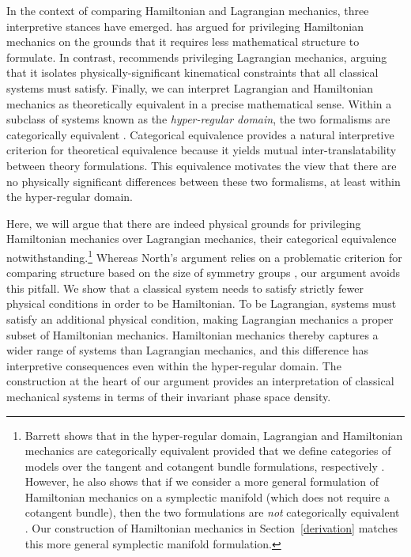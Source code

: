 \documentclass[12pt, english, twoside]{article} %
\begin{document}
In the context of comparing Hamiltonian and Lagrangian mechanics, three interpretive stances have emerged. \textcites[]{North} has argued for privileging Hamiltonian mechanics on the grounds that it requires less mathematical structure to formulate. In contrast, \textcites[]{Curiel} recommends privileging Lagrangian mechanics, arguing that it isolates physically-significant kinematical constraints that all classical systems must satisfy. Finally, we can interpret Lagrangian and Hamiltonian mechanics as theoretically equivalent in a precise mathematical sense. Within a subclass of systems known as the \textit{hyper-regular domain}, the two formalisms are categorically equivalent \parencites[]{Teh}{Barrett2}. Categorical equivalence provides a natural interpretive criterion for theoretical equivalence because it yields mutual inter-translatability between theory formulations. This equivalence motivates the view that there are no physically significant differences between these two formalisms, at least within the hyper-regular domain. 

Here, we will argue that there are indeed physical grounds for privileging Hamiltonian mechanics over Lagrangian mechanics, their categorical equivalence notwithstanding.\footnote{Barrett shows that in the hyper-regular domain, Lagrangian and Hamiltonian mechanics are categorically equivalent provided that we define categories of models over the tangent and cotangent bundle formulations, respectively \parencites*[1181-82]{Barrett2}. However, he also shows that if we consider a more general formulation of Hamiltonian mechanics on a symplectic manifold (which does not require a cotangent bundle), then the two formulations are \textit{not} categorically equivalent \parencites*[1182-83]{Barrett2}. Our construction of Hamiltonian mechanics in Section~\ref{derivation} matches this more general symplectic manifold formulation.} Whereas North's argument relies on a problematic criterion for comparing structure based on the size of symmetry groups \parencites[]{Swanson}, our argument avoids this pitfall. We show that a classical system needs to satisfy strictly fewer physical conditions in order to be Hamiltonian. To be Lagrangian, systems must satisfy an additional physical condition, making Lagrangian mechanics a proper subset of Hamiltonian mechanics. Hamiltonian mechanics thereby captures a wider range of systems than Lagrangian mechanics, and this difference has interpretive consequences even within the hyper-regular domain. The construction at the heart of our argument provides an interpretation of classical mechanical systems in terms of their invariant phase space density. 
\end{document}
